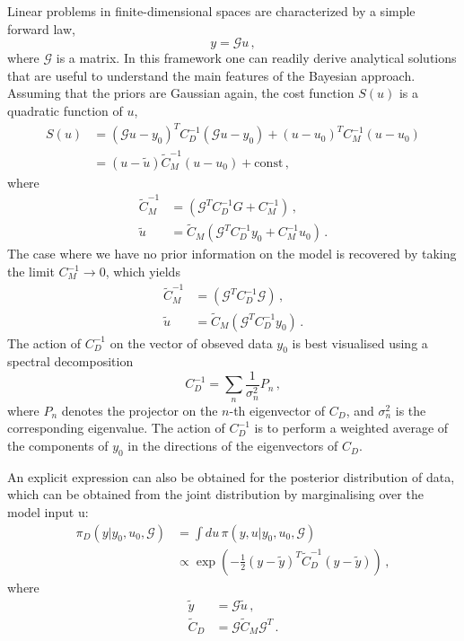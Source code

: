 Linear problems in finite-dimensional spaces are characterized by a simple forward law, 
\begin{equation}
  \label{eq:MatrixG}
  y = \mathcal{G} u\, ,
\end{equation}
where $\mathcal{G}$ is a matrix. In this framework one can readily  derive
analytical solutions that are useful to understand the main features of the
Bayesian approach. Assuming that the priors are Gaussian again, the cost
function $S(u)$ is a quadratic function of $u$,
\begin{align}
  \label{eq:CostLinGauss}
  S(u) &= 
  \left(\mathcal{G} u - y_0 \right)^T C_D^{-1} 
  \left(\mathcal{G} u - y_0 \right) + 
  \left( u - u_0 \right)^T C_M^{-1} \left(u - u_0 \right) \\
  &= 
  \left(u - \tilde{u}\right) \tilde{C}_M^{-1}
  \left(u - u_0\right) + \mathrm{const}\, ,
\end{align} 
where
\begin{align}
  \label{eq:PostParams}
  \tilde{C}_M^{-1} &= 
  \left(
    \mathcal{G}^T C_D^{-1} G + C_M^{-1}
  \right)\, , \\
  \tilde{u} &=
  \tilde{C}_M  \left(
    \mathcal{G}^T C_D^{-1} y_0 + C_M^{-1} u_0
  \right)\, .
\end{align}
The case where we have no prior information on the model is recovered by taking
the limit $C_M^{-1} \to 0$, which yields
\begin{align}
  \label{eq:NoPriorLinModel}
  \tilde{C}_M^{-1} &= 
  \left(
    \mathcal{G}^T C_D^{-1} \mathcal{G}
  \right)\, , \\
  \tilde{u} &=
  \tilde{C}_M  \left(
    \mathcal{G}^T C_D^{-1} y_0 
  \right)\, .
\end{align}
The action of $C_D^{-1}$ on the vector of obseved data $y_0$ is best visualised using a spectral decomposition
\begin{equation}
  \label{eq:CDSpecDec}
  C_D^{-1} = \sum_n \frac{1}{\sigma_n^2} P_n\, ,
\end{equation}
where $P_n$ denotes the projector on the $n$-th eigenvector of $C_D$, and
$\sigma_n^2$ is the corresponding eigenvalue. The action of $C_D^{-1}$ is to
perform a weighted average of the components of $y_0$ in the directions of the
eigenvectors of $C_D$.

An explicit expression can also be obtained for the posterior distribution of
data, which can be obtained from the joint distribution by marginalising over
the model input u:
\begin{align}
  \pi_D(y|y_0,u_0,\mathcal{G})
  &= \int du\, \pi(y,u|y_0,u_0,\mathcal{G}) \\
  &\propto \exp\left(
    -\frac12 \left(y - \tilde{y}\right)^T \tilde{C}_D^{-1}
    \left(y - \tilde{y}\right)
  \right)\, ,
\end{align}
where
\begin{align}
  \tilde{y} &= \mathcal{G} \tilde{u}\, , \\
  \tilde{C}_D &= \mathcal{G} \tilde{C}_M \mathcal{G}^T\, .
\end{align}

